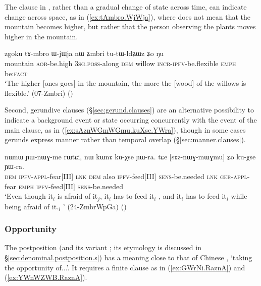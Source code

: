 The clause in , rather than a gradual change of state across time, can indicate change across space, as in (\ref{ex:tAmbro.WjWja}), where  does not mean that the mountain becomes higher, but rather that the person observing the plants moves higher in the mountain.

\begin{exe}
\ex \label{ex:tAmbro.WjWja}
\gll  zgoku tɤ-mbro ɯ-jɯja nɯ ʑmbri tu-tɯ-ldʑɯz ʑo ŋu \\
mountain \textsc{aor}-be.high \textsc{3sg}.\textsc{poss}-along \textsc{dem} willow \textsc{incr}\redp{}-\textsc{ipfv}-be.flexible \textsc{emph} be:\textsc{fact} \\
\glt `The higher [ones goes] in the mountain, the more the [wood] of the willows is flexible.' (07-Zmbri)
()
\end{exe}

Second, gerundive clauses (§\ref{sec:gerund.clauses}) are an alternative possibility to indicate a background event or state occurring concurrently with the event of the main clause, as in (\ref{ex:sAznWGmWGmu.kuXse.YWra}), though in some cases gerunds express manner rather than temporal overlap (§\ref{sec:manner.clauses}).
 
\begin{exe}
\ex \label{ex:sAznWGmWGmu.kuXse.YWra}
\gll nɯnɯ ɲɯ-nɯɣ-me rɯtɕi, nɯ kɯnɤ ku-χse ɲɯ-ra.  tɕe [sɤz-nɯɣ-mɯ\redp{}ɣmu] ʑo ku-χse ɲɯ-ra. \\
\textsc{dem} \textsc{ipfv}-\textsc{appl}-fear[III] \textsc{lnk} \textsc{dem} also \textsc{ipfv}-feed[III] \textsc{sens}-be.needed \textsc{lnk} \textsc{ger}-\textsc{appl}-fear \textsc{emph} \textsc{ipfv}-feed[III]  \textsc{sens}-be.needed \\
\glt `Even though it$_i$ is afraid of it$_j$, it$_i$ has to feed it$_i$ , and it$_i$ has to feed it$_i$  while being afraid of it.$_i$ '  (24-ZmbrWpGa) 
()
\end{exe}

 

\subsubsection{Opportunity} \label{sec:RaznA}
The postposition  (and its variant ; its etymology is discussed in §\ref{sec:denominal.postposition.s}) has a meaning close to that of Chinese , `taking the opportunity of...'. It requires a finite clause as in (\ref{ex:GWrNi.RaznA}) and (\ref{ex:YWnWZWB.RaznA}).

